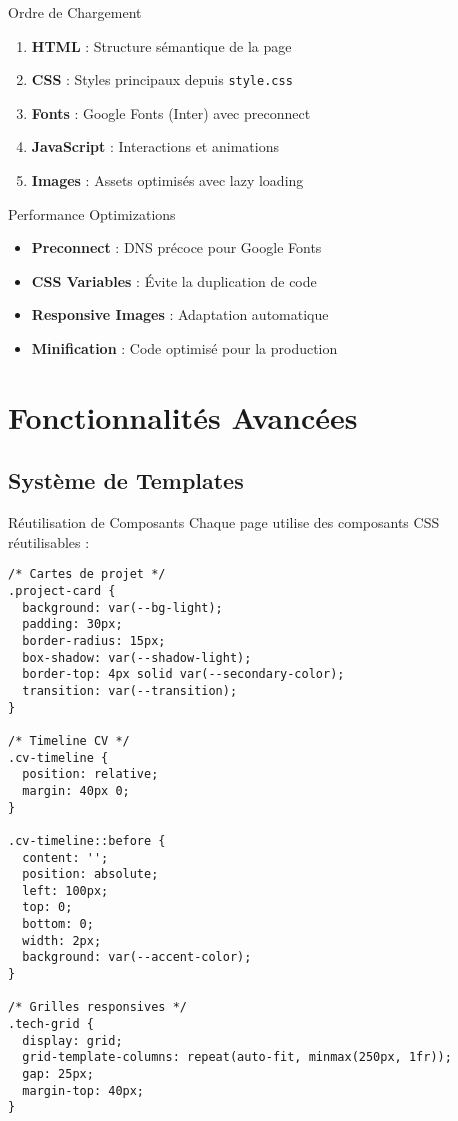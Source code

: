 \documentclass[12pt,a4paper]{article}
\begin{document}
\begin{greenbox}{Ordre de Chargement}
\begin{enumerate}[label=\textcolor{greencolor}{\arabic*.}]
    \item \textbf{HTML} : Structure sémantique de la page
    \item \textbf{CSS} : Styles principaux depuis \texttt{style.css}
    \item \textbf{Fonts} : Google Fonts (Inter) avec preconnect
    \item \textbf{JavaScript} : Interactions et animations
    \item \textbf{Images} : Assets optimisés avec lazy loading
\end{enumerate}
\end{greenbox}

\begin{redbox}{Performance Optimizations}
\begin{itemize}[label=\textcolor{redcolor}{$\triangleright$}]
    \item \textbf{Preconnect} : DNS précoce pour Google Fonts
    \item \textbf{CSS Variables} : Évite la duplication de code
    \item \textbf{Responsive Images} : Adaptation automatique
    \item \textbf{Minification} : Code optimisé pour la production
\end{itemize}
\end{redbox}

\section{Fonctionnalités Avancées}

\subsection{Système de Templates}

\begin{bluebox}{Réutilisation de Composants}
Chaque page utilise des composants CSS réutilisables :
\end{bluebox}

\begin{lstlisting}[style=cssstyle, caption=Composants CSS réutilisables]
/* Cartes de projet */
.project-card {
  background: var(--bg-light);
  padding: 30px;
  border-radius: 15px;
  box-shadow: var(--shadow-light);
  border-top: 4px solid var(--secondary-color);
  transition: var(--transition);
}

/* Timeline CV */
.cv-timeline {
  position: relative;
  margin: 40px 0;
}

.cv-timeline::before {
  content: '';
  position: absolute;
  left: 100px;
  top: 0;
  bottom: 0;
  width: 2px;
  background: var(--accent-color);
}

/* Grilles responsives */
.tech-grid {
  display: grid;
  grid-template-columns: repeat(auto-fit, minmax(250px, 1fr));
  gap: 25px;
  margin-top: 40px;
}
\end{lstlisting}
\end{document}
